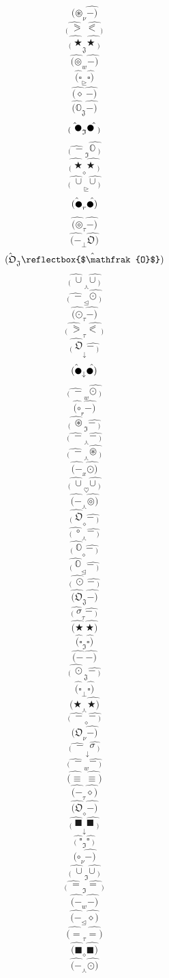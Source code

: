 \documentclass[12pt]{article}
\begin{document}
\begin{multicols}{5}
$$\hat{(\circledast} _\nu \hat{-)}$$
$$\hat{_( \ \eqslantgtr} \  \hat{\eqslantless\ _)}$$
$$\hat{_( \ \bigstar} _\mathfrak{J} \hat{\bigstar\ _)}$$
$$\hat{(\circledcirc} _w \hat{-)}$$
$$\hat{(\square} _\trianglerighteq \hat{\square)}$$
$$\hat{(\diamond} \  \hat{-)}$$
$$\hat{(\mathbb{O}} _\mathfrak{J} \hat{-)}$$
$$\hat{_( \ \newmoon} _\mathfrak{I} \hat{\newmoon\ _)}$$
$$\hat{_( \ -} _\mathfrak{I} \hat{\mathbb{O}\ _)}$$
$$\hat{_( \ \bigstar} _\diamond \hat{\bigstar\ _)}$$
$$\hat{_( \ \cup} _\trianglerighteq \hat{\cup\ _)}$$
$$\hat{(\newmoon} _r \hat{\newmoon)}$$
$$\hat{(\circledcirc} _\tau \hat{-)}$$
$$\hat{(-} _\bot \hat{\mathfrak{O})}$$
$$\hat{(\mathfrak{O}} _\mathfrak{J} \hat{\reflectbox{$\mathfrak{O}$})}$$
$$\hat{_( \ \cup} _\curlywedge \hat{\cup\ _)}$$
$$\hat{_( \ -} _\trianglelefteq \hat{\odot\ _)}$$
$$\hat{(\odot} _\tau \hat{-)}$$
$$\hat{_( \ \eqslantgtr} _\tau \hat{\eqslantless\ _)}$$
$$\hat{_( \ \mathfrak{O}} _\downarrow \hat{-\ _)}$$
$$\hat{(\newmoon} _\downarrow \hat{\newmoon)}$$
$$\hat{_( \ -} _w \hat{\odot\ _)}$$
$$\hat{(\circ} _r \hat{-)}$$
$$\hat{_( \ \circledast} _\mathfrak{I} \hat{-\ _)}$$
$$\hat{_( \ -} _\curlywedge \hat{-\ _)}$$
$$\hat{_( \ -} _\curlywedge \hat{\circledast\ _)}$$
$$\hat{(-} _x \hat{\odot)}$$
$$\hat{_( \ \cup} _\heartsuit \hat{\cup\ _)}$$
$$\hat{(-} _\curlywedge \hat{\circledcirc)}$$
$$\hat{_( \ \mathfrak{O}} _\diamond \hat{-\ _)}$$
$$\hat{_( \ \circ} _\curlywedge \hat{-\ _)}$$
$$\hat{_( \ \mathbb{O}} _\diamond \hat{-\ _)}$$
$$\hat{_( \ \mathbb{O}} _\trianglelefteq \hat{-\ _)}$$
$$\hat{_( \ \odot} \  \hat{-\ _)}$$
$$\hat{(\mathfrak{O}} _\mathfrak{J} \hat{-)}$$
$$\hat{_( \ \sigma} _\tau \hat{-\ _)}$$
$$\hat{(\bigstar} \  \hat{\bigstar)}$$
$$\hat{(\square} _\mathfrak{I} \hat{\square)}$$
$$\hat{(-} \  \hat{-)}$$
$$\hat{_( \ \odot} _\mathfrak{J} \hat{-\ _)}$$
$$\hat{(\square} _\bot \hat{\square)}$$
$$\hat{(\bigstar} _\curlywedge \hat{\bigstar)}$$
$$\hat{_( \ -} _\diamond \hat{-\ _)}$$
$$\hat{(\mathfrak{O}} _\nu \hat{-)}$$
$$\hat{_( \ -} _\downarrow \hat{\sigma\ _)}$$
$$\hat{_( \ -} _w \hat{-\ _)}$$
$$\hat{(\equiv} \  \hat{\equiv)}$$
$$\hat{(-} _\tau \hat{\diamond)}$$
$$\hat{(\mathfrak{O}} _\diamond \hat{-)}$$
$$\hat{_( \ \blacksquare} _\downarrow \hat{\blacksquare\ _)}$$
$$\hat{_( \ \square} _\mathfrak{I} \hat{\square\ _)}$$
$$\hat{(\circ} _\nu \hat{-)}$$
$$\hat{_( \ \cup} _\mathfrak{I} \hat{\cup\ _)}$$
$$\hat{_( \ =} _\mathfrak{I} \hat{=\ _)}$$
$$\hat{(-} _w \hat{-)}$$
$$\hat{(-} _\trianglelefteq \hat{\diamond)}$$
$$\hat{(=} _\tau \hat{=)}$$
$$\hat{(\blacksquare} _\diamond \hat{\blacksquare)}$$
$$\hat{(-} _\curlywedge \hat{\odot)}$$

\end{multicols}
\end{document}
